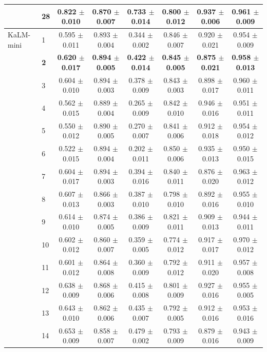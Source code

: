 \begin{longtable}{llcccccc}
 & 28 & 0.822 $\pm$ 0.010 & 0.870 $\pm$ 0.007 & 0.733 $\pm$ 0.014 & 0.800 $\pm$ 0.012 & 0.937 $\pm$ 0.006 & 0.961 $\pm$ 0.009 \\
\midrule
KaLM-mini & 1 & 0.595 $\pm$ 0.011 & 0.893 $\pm$ 0.004 & 0.344 $\pm$ 0.002 & 0.846 $\pm$ 0.007 & 0.920 $\pm$ 0.021 & 0.954 $\pm$ 0.009 \\
 & \textbf{2} & \textbf{0.620 $\pm$ 0.017} & \textbf{0.894 $\pm$ 0.005} & \textbf{0.422 $\pm$ 0.014} & \textbf{0.845 $\pm$ 0.005} & \textbf{0.875 $\pm$ 0.021} & \textbf{0.958 $\pm$ 0.013} \\
 & 3 & 0.604 $\pm$ 0.010 & 0.894 $\pm$ 0.003 & 0.378 $\pm$ 0.009 & 0.843 $\pm$ 0.003 & 0.898 $\pm$ 0.017 & 0.960 $\pm$ 0.011 \\
 & 4 & 0.562 $\pm$ 0.015 & 0.889 $\pm$ 0.004 & 0.265 $\pm$ 0.009 & 0.842 $\pm$ 0.010 & 0.946 $\pm$ 0.016 & 0.951 $\pm$ 0.011 \\
 & 5 & 0.550 $\pm$ 0.012 & 0.890 $\pm$ 0.005 & 0.270 $\pm$ 0.007 & 0.841 $\pm$ 0.006 & 0.912 $\pm$ 0.018 & 0.954 $\pm$ 0.012 \\
 & 6 & 0.522 $\pm$ 0.015 & 0.894 $\pm$ 0.004 & 0.202 $\pm$ 0.011 & 0.850 $\pm$ 0.006 & 0.935 $\pm$ 0.013 & 0.950 $\pm$ 0.015 \\
 & 7 & 0.604 $\pm$ 0.017 & 0.894 $\pm$ 0.003 & 0.394 $\pm$ 0.016 & 0.840 $\pm$ 0.011 & 0.876 $\pm$ 0.020 & 0.963 $\pm$ 0.012 \\
 & 8 & 0.607 $\pm$ 0.013 & 0.866 $\pm$ 0.003 & 0.387 $\pm$ 0.010 & 0.798 $\pm$ 0.010 & 0.892 $\pm$ 0.016 & 0.955 $\pm$ 0.010 \\
 & 9 & 0.614 $\pm$ 0.010 & 0.874 $\pm$ 0.005 & 0.386 $\pm$ 0.009 & 0.821 $\pm$ 0.011 & 0.909 $\pm$ 0.013 & 0.944 $\pm$ 0.011 \\
 & 10 & 0.602 $\pm$ 0.012 & 0.860 $\pm$ 0.007 & 0.359 $\pm$ 0.005 & 0.774 $\pm$ 0.012 & 0.917 $\pm$ 0.017 & 0.970 $\pm$ 0.012 \\
 & 11 & 0.601 $\pm$ 0.012 & 0.864 $\pm$ 0.008 & 0.360 $\pm$ 0.009 & 0.792 $\pm$ 0.012 & 0.911 $\pm$ 0.020 & 0.957 $\pm$ 0.008 \\
 & 12 & 0.638 $\pm$ 0.009 & 0.868 $\pm$ 0.006 & 0.415 $\pm$ 0.008 & 0.801 $\pm$ 0.009 & 0.927 $\pm$ 0.016 & 0.955 $\pm$ 0.005 \\
 & 13 & 0.643 $\pm$ 0.010 & 0.862 $\pm$ 0.006 & 0.435 $\pm$ 0.007 & 0.792 $\pm$ 0.005 & 0.912 $\pm$ 0.016 & 0.953 $\pm$ 0.016 \\
 & 14 & 0.653 $\pm$ 0.009 & 0.858 $\pm$ 0.007 & 0.479 $\pm$ 0.002 & 0.793 $\pm$ 0.009 & 0.879 $\pm$ 0.016 & 0.943 $\pm$ 0.009 \\

\end{longtable}
